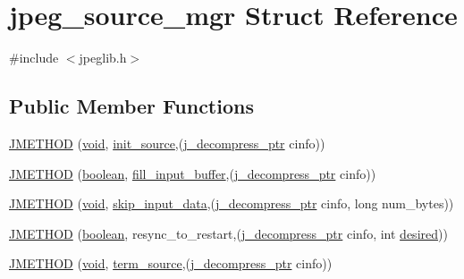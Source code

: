 \hypertarget{structjpeg__source__mgr}{}\section{jpeg\+\_\+source\+\_\+mgr Struct Reference}
\label{structjpeg__source__mgr}


{\ttfamily \#include $<$jpeglib.\+h$>$}

\subsection*{Public Member Functions}
\begin{DoxyCompactItemize}
\item 
\hyperlink{structjpeg__source__mgr_af8fda02c19c9dc4e505daabb77c3ad81}{J\+M\+E\+T\+H\+O\+D} (\hyperlink{png_8h_aa8c59027f9ab2769342f248709d68d17}{void}, \hyperlink{jdatasrc_8c_ada3118e56d083499ce141e98ec116648}{init\+\_\+source},(\hyperlink{jpeglib_8h_a00c7d78af44bd26a901c791ccfc1e178}{j\+\_\+decompress\+\_\+ptr} cinfo))
\item 
\hyperlink{structjpeg__source__mgr_ab4a579b1f50108e2de73c7c0c1bbb9fd}{J\+M\+E\+T\+H\+O\+D} (\hyperlink{jmorecfg_8h_a7c6368b321bd9acd0149b030bb8275ed}{boolean}, \hyperlink{jdatasrc_8c_aa3542f61993ed4a526694556fac65941}{fill\+\_\+input\+\_\+buffer},(\hyperlink{jpeglib_8h_a00c7d78af44bd26a901c791ccfc1e178}{j\+\_\+decompress\+\_\+ptr} cinfo))
\item 
\hyperlink{structjpeg__source__mgr_a3e29df8ddadb0c15e54b69b5a7a10305}{J\+M\+E\+T\+H\+O\+D} (\hyperlink{png_8h_aa8c59027f9ab2769342f248709d68d17}{void}, \hyperlink{jdatasrc_8c_ae539a6d1c36b54a0ef6168fecdc8379e}{skip\+\_\+input\+\_\+data},(\hyperlink{jpeglib_8h_a00c7d78af44bd26a901c791ccfc1e178}{j\+\_\+decompress\+\_\+ptr} cinfo, long num\+\_\+bytes))
\item 
\hyperlink{structjpeg__source__mgr_a60a35ccd1fb8d954f34c0cdbf29ac010}{J\+M\+E\+T\+H\+O\+D} (\hyperlink{jmorecfg_8h_a7c6368b321bd9acd0149b030bb8275ed}{boolean}, resync\+\_\+to\+\_\+restart,(\hyperlink{jpeglib_8h_a00c7d78af44bd26a901c791ccfc1e178}{j\+\_\+decompress\+\_\+ptr} cinfo, int \hyperlink{jpeglib_8h_a3450f7500f843178b4517d0e7ef2b537}{desired}))
\item 
\hyperlink{structjpeg__source__mgr_a6c0683ce1166b9ee659b2d3aa1efb1c2}{J\+M\+E\+T\+H\+O\+D} (\hyperlink{png_8h_aa8c59027f9ab2769342f248709d68d17}{void}, \hyperlink{jdatasrc_8c_a0337cf4ba81c0f78c48b5de379cca33e}{term\+\_\+source},(\hyperlink{jpeglib_8h_a00c7d78af44bd26a901c791ccfc1e178}{j\+\_\+decompress\+\_\+ptr} cinfo))
\end{DoxyCompactItemize}
